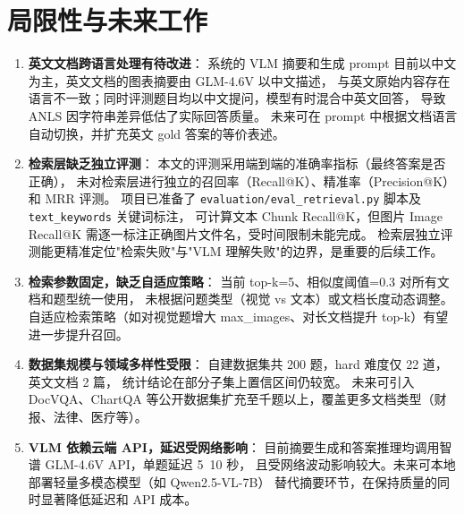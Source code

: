 ﻿\documentclass[UTF8, heading=true]{ctexart}
\begin{document}
\section{局限性与未来工作}
\begin{enumerate}
    \item \textbf{英文文档跨语言处理有待改进}：
    系统的 VLM 摘要和生成 prompt 目前以中文为主，英文文档的图表摘要由 GLM-4.6V 以中文描述，
    与英文原始内容存在语言不一致；同时评测题目均以中文提问，模型有时混合中英文回答，
    导致 ANLS 因字符串差异低估了实际回答质量。
    未来可在 prompt 中根据文档语言自动切换，并扩充英文 gold 答案的等价表述。

    \item \textbf{检索层缺乏独立评测}：
    本文的评测采用端到端的准确率指标（最终答案是否正确），
    未对检索层进行独立的召回率（Recall@K）、精准率（Precision@K）和 MRR 评测。
    项目已准备了 \texttt{evaluation/eval\_retrieval.py} 脚本及 \texttt{text\_keywords} 关键词标注，
    可计算文本 Chunk Recall@K，但图片 Image Recall@K 需逐一标注正确图片文件名，受时间限制未能完成。
    检索层独立评测能更精准定位"检索失败"与"VLM 理解失败"的边界，是重要的后续工作。

    \item \textbf{检索参数固定，缺乏自适应策略}：
    当前 top-k=5、相似度阈值=0.3 对所有文档和题型统一使用，
    未根据问题类型（视觉 vs 文本）或文档长度动态调整。
    自适应检索策略（如对视觉题增大 max\_images、对长文档提升 top-k）有望进一步提升召回。

    \item \textbf{数据集规模与领域多样性受限}：
    自建数据集共 200 题，hard 难度仅 22 道，英文文档 2 篇，
    统计结论在部分子集上置信区间仍较宽。
    未来可引入 DocVQA、ChartQA 等公开数据集扩充至千题以上，覆盖更多文档类型（财报、法律、医疗等）。

    \item \textbf{VLM 依赖云端 API，延迟受网络影响}：
    目前摘要生成和答案推理均调用智谱 GLM-4.6V API，单题延迟 5~10 秒，
    且受网络波动影响较大。未来可本地部署轻量多模态模型（如 Qwen2.5-VL-7B）
    替代摘要环节，在保持质量的同时显著降低延迟和 API 成本。
\end{enumerate}


\end{document}
